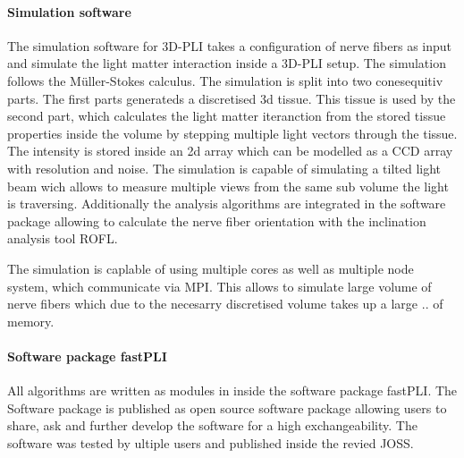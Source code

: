 \paragraph{Simulation software}
% 
The simulation software for \ac{3D-PLI} takes a configuration of nerve fibers as input and simulate the light matter interaction inside a \ac{3D-PLI} setup.
The simulation follows the M\"{u}ller-Stokes calculus.
The simulation is split into two conesequitiv parts.
The first parts generateds a discretised 3d tissue.
This tissue is used by the second part, which calculates the light matter iteranction from the stored tissue properties inside the volume by stepping multiple light vectors through the tissue.
The intensity is stored inside an 2d array which can be modelled as a \ac{CCD} array with resolution and noise.
The simulation is capable of simulating a tilted light beam wich allows to measure multiple views from the same sub volume the light is traversing.
Additionally the analysis algorithms are integrated in the software package allowing to calculate the nerve fiber orientation with the inclination analysis tool \ac{ROFL}.
\par
% 
The simulation is caplable of using multiple cores as well as multiple node system, which communicate via \ac{MPI}.
This allows to simulate large volume of nerve fibers which due to the necesarry discretised volume takes up a large .. of memory.
% 
% 
% 
\paragraph{Software package \acs{fastPLI}}
% 
All algorithms are written as modules in \python{} inside the software package \ac{fastPLI}.
The Software package is published as open source software package allowing users to share, ask and further develop the software for a high exchangeability. 
The software was tested by ultiple users and published inside the revied \ac{JOSS}.
% 
% 
% 
